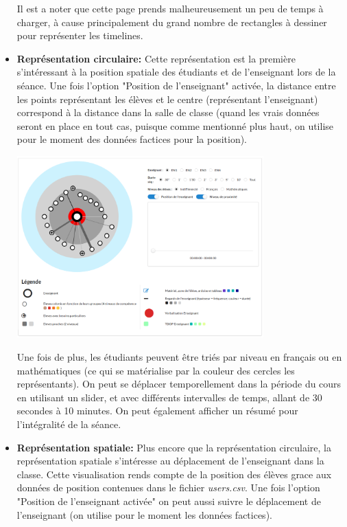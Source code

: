 \documentclass{article}
\begin{document}
\begin{itemize}
\begin{center}
        \end{center}
        Il est a noter que cette page prends malheureusement un peu de temps à charger, à cause principalement du grand nombre de rectangles à dessiner pour représenter les timelines.\\
    \item \textbf{Représentation circulaire:} Cette représentation est la première s'intéressant à la position spatiale des étudiants et de l'enseignant lors de la séance. Une fois l'option "Position de l'enseignant" activée, la distance entre les points représentant les élèves et le centre (représentant l'enseignant) correspond à la distance dans la salle de classe (quand les vrais données seront en place en tout cas, puisque comme mentionné plus haut, on utilise pour le moment des données factices pour la position).
        \begin{center}
            \includegraphics[height=7cm]{rep_circulaire.png}
        \end{center}
        Une fois de plus, les étudiants peuvent être triés par niveau en français ou en mathématiques (ce qui se matérialise par la couleur des cercles les représentants). On peut se déplacer temporellement dans la période du cours en utilisant un slider, et avec différents intervalles de temps, allant de 30 secondes à 10 minutes. On peut également afficher un résumé pour l'intégralité de la séance.\\
    \item \textbf{Représentation spatiale:} Plus encore que la représentation circulaire, la représentation spatiale s'intéresse au déplacement de l'enseignant dans la classe. Cette visualisation rends compte de la position des élèves grace aux données de position contenues dans le fichier \textit{users.csv}. Une fois l'option "Position de l'enseignant activée" on peut aussi suivre le déplacement de l'enseignant (on utilise pour le moment les données factices).

\end{itemize}
\end{document}
